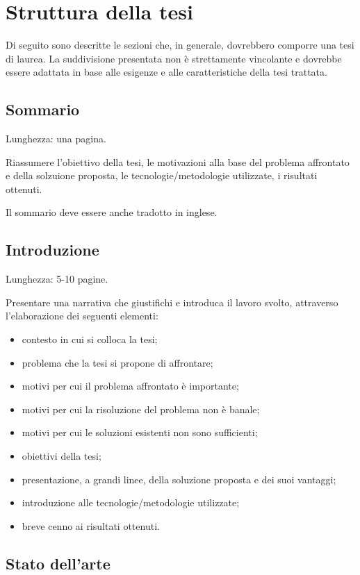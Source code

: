 \clearpage{\pagestyle{empty}\cleardoublepage}
\chapter{Struttura della tesi}
\label{chap:struttura}

Di seguito sono descritte le sezioni che, in generale, dovrebbero comporre una tesi di laurea. La suddivisione presentata non è strettamente vincolante e dovrebbe essere adattata in base alle esigenze e alle caratteristiche della tesi trattata.

\section{Sommario}

Lunghezza: una pagina.

Riassumere l'obiettivo della tesi, le motivazioni alla base del problema affrontato e della solzuione proposta, le tecnologie/metodologie utilizzate, i risultati ottenuti.

Il sommario deve essere anche tradotto in inglese.

\section{Introduzione}

Lunghezza: 5-10 pagine.

Presentare una narrativa che giustifichi e introduca il lavoro svolto, attraverso l'elaborazione dei seguenti elementi:
\begin{itemize}
 \item contesto in cui si colloca la tesi;
 \item problema che la tesi si propone di affrontare;
 \item motivi per cui il problema affrontato è importante;
 \item motivi per cui la risoluzione del problema non è banale;
 \item motivi per cui le soluzioni esistenti non sono sufficienti;
 \item obiettivi della tesi;
 \item presentazione, a grandi linee, della soluzione proposta e dei suoi vantaggi;
 \item introduzione alle tecnologie/metodologie utilizzate;
 \item breve cenno ai risultati ottenuti.
\end{itemize}

\section{Stato dell'arte}

